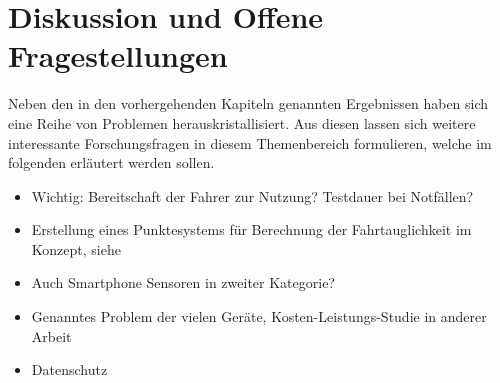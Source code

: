 \section{Diskussion und Offene Fragestellungen}
\label{openChallenges}

Neben den in den vorhergehenden Kapiteln genannten Ergebnissen haben sich eine Reihe von Problemen herauskristallisiert. Aus diesen lassen sich weitere interessante Forschungsfragen in diesem Themenbereich formulieren, welche im folgenden erläutert werden sollen.


\begin{itemize}
	\item Wichtig: Bereitschaft der Fahrer zur Nutzung? Testdauer bei Notfällen?
	\item Erstellung eines Punktesystems für Berechnung der Fahrtauglichkeit im Konzept, siehe \cite{drivesafe}
	\item Auch Smartphone Sensoren in zweiter Kategorie? \cite{validationphysicalactivitytracking, bewegungserkennungsensoren}
	\item Genanntes Problem der vielen Geräte, Kosten-Leistungs-Studie in anderer Arbeit
	\item Datenschutz \cite{beurteilungskriterienleipzig, securityprivacyfitnesstracking}
\end{itemize}
